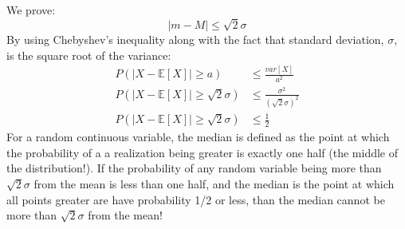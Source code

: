 \documentclass[a4paper,12pt]{article}
\begin{document}
\section{}
We prove:
$$
|m - M| \leq \sqrt{2}\sigma
$$
By using Chebyshev's inequality along with the fact that standard deviation, $\sigma$, is the square root of the variance:
\begin{align*}
P(| X - \mathbb{E}[X]| \geq a) &\leq \frac{var[X]}{a^2} \\
P(| X - \mathbb{E}[X]| \geq \sqrt{2}\sigma) &\leq \frac{\sigma^2}{(\sqrt{2}\sigma)^2} \\
P(| X - \mathbb{E}[X]| \geq \sqrt{2}\sigma) &\leq \frac{1}{2}
\end{align*}
For a random continuous variable, the median is defined as the point at which the probability of a a realization being greater is exactly one half (the middle of the distribution!). If the probability of any random variable being more than $\sqrt{2}\sigma$ from the mean is less than one half, and the median is the point at which all points greater are have probability 1/2 or less, than the median cannot be more than $\sqrt{2}\sigma$ from the mean!
\end{document}
